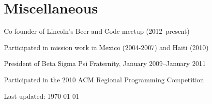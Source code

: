 \documentclass[10pt,letterpaper]{article}
\renewenvironment{itemize}{
  \begin{list}{}{
    \setlength{\leftmargin}{1.5em}
    \setlength{\itemsep}{0.25em}
    \setlength{\parskip}{0pt}
    \setlength{\parsep}{0.25em}
  }
}{
  \end{list}
}
\begin{document}

\section*{Miscellaneous}

\begin{itemize}
    \item Co-founder of Lincoln's Beer and Code meetup (2012--present)
    \item Participated in mission work in Mexico (2004-2007) and Haiti (2010)
    \item President of Beta Sigma Psi Fraternity, January 2009--January 2011
    \item Participated in the 2010 ACM Regional Programming Competition
\end{itemize}

\bigskip

\begin{center}
  \begin{small}
    Last updated: \today
  \end{small}
\end{center}
\end{document}
